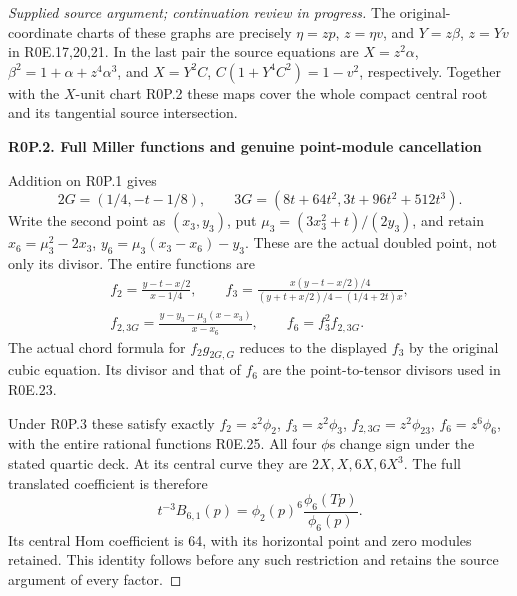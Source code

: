 \begin{proof}[Supplied source argument; continuation review in progress]
The original-coordinate charts of these graphs are precisely
\(\eta=zp\), \(z=\eta v\), and \(Y=z\beta\), \(z=Yv\)
in R0E.17,20,21. In the last pair the source equations are
\(X=z^2\alpha\), \(\beta^2=1+\alpha+z^4\alpha^3\), and
\(X=Y^2C\), \(C(1+Y^4C^2)=1-v^2\), respectively. Together
with the \(X\)-unit chart R0P.2 these maps cover the whole compact
central root and its tangential source intersection.

\par

\medskip\noindent\textbf{R0P.2. Full Miller functions and genuine point-module cancellation}

\par\nobreak

Addition on R0P.1 gives
\[
 2G=(1/4,-t-1/8),\qquad
 3G=(8t+64t^2,3t+96t^2+512t^3).
 \tag{R0P.7}
\]
Write the second point as \((x_3,y_3)\), put
\(\mu_3=(3x_3^2+t)/(2y_3)\), and retain
\(x_6=\mu_3^2-2x_3\),
\(y_6=\mu_3(x_3-x_6)-y_3\). These are the actual doubled
point, not only its divisor. The entire functions are
\[
 \begin{gathered}
 f_2=\frac{y-t-x/2}{x-1/4},\qquad
 f_3=\frac{x(y-t-x/2)/4}{(y+t+x/2)/4-(1/4+2t)x},\\
 f_{2,3G}=\frac{y-y_3-\mu_3(x-x_3)}{x-x_6},\qquad
 f_6=f_3^2f_{2,3G}.
 \end{gathered}
 \tag{R0P.8}
\]
The actual chord formula for \(f_2g_{2G,G}\) reduces to the
displayed \(f_3\) by the original cubic equation. Its divisor and
that of \(f_6\) are the point-to-tensor divisors used in R0E.23.

Under R0P.3 these satisfy exactly
\(f_2=z^2\phi_2\), \(f_3=z^2\phi_3\),
\(f_{2,3G}=z^2\phi_{23}\), \(f_6=z^6\phi_6\), with the
entire rational functions R0E.25. All four \(\phi\)\textquotesingle s change sign
under the stated quartic deck. At its central curve they are
\(2X,X,6X,6X^3\). The full translated coefficient is therefore
\[
 t^{-3}B_{6,1}(p)=
 \phi_2(p)^6\frac{\phi_6(Tp)}{\phi_6(p)}.
 \tag{R0P.9}
\]
Its central Hom coefficient is 64, with its horizontal point and
zero modules retained. This identity follows before any such
restriction and retains the source argument of every factor.


\end{proof}
